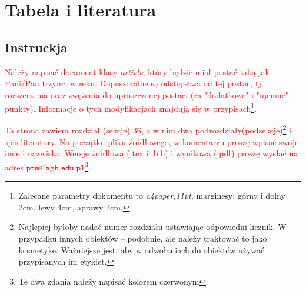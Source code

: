 \documentclass[a4paper, 11pt]{article}
\begin{document}

\pagestyle{fancy}
\section{Tabela i literatura}
\label{title}

\subsection{Instruckja}
\textcolor{red}{
Należy napisać document klasy {\em article}, który będzie miał postać taką jak Pani/Pan trzyma w ręku. Dopuszczalne są odstępstwa od tej postac, tj. rozszerzenia oraz zwężenia do uproszczonej postaci (za "dodatkowe" i "ujemne" punkty). Informacje o tych modyfikacjach znajdują się w przypisach\footnote{Zalecane parametry dokumentu to {\em a4paper,11pt}, marginesy: górny i dolny 2cm, lewy 4cm, aprawy 2cm.}.}

\textcolor{red}{
Ta strona zawiera rozdział (sekcje) 36, a w nim dwa podrozdziały(podsekcje)\footnote{Najlepiej byłoby nadać numer rozdziału ustawiając odpowiedni licznik. W przypadku innych obiektów -- podobnie, ale należy traktować to jako kosmetykę. Ważniejsze jest, aby w odwołaniach do obiektów używać przypisanych im etykiet.} i spis literatury. Na początku pliku źródłowego, w komentarzu proszę wpisać swoje imię i nazwisko. Wersję źródłową (.tex i .bib) i wynikową (.pdf) proszę wysłąć na adres $\mathtt{ptm@agh.edu.pl}$\footnote{Te dwa zdania należy napisać kolorem czerwonym}.}
\end{document}
